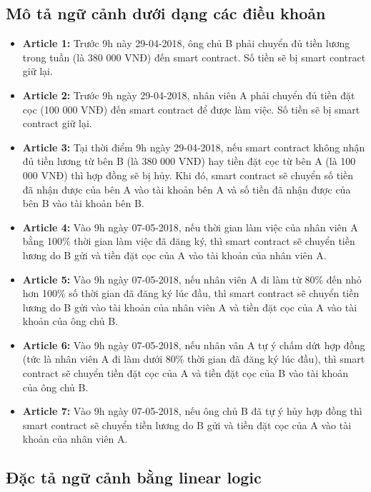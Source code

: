 \documentclass[12pt,a4paper,oneside]{article}
\begin{document}
\subsection{Mô tả ngữ cảnh dưới dạng các điều khoản}
\begin{itemize}
	\item \textbf{Article 1:} Trước 9h này 29-04-2018, ông chủ B phải chuyển đủ tiền lương trong tuần (là 380 000 VNĐ) đến smart contract. Số tiền sẽ bị smart contract giữ lại.
	\item \textbf{Article 2:} Trước 9h ngày 29-04-2018, nhân viên A phải chuyển đủ tiền đặt cọc (100 000 VNĐ) đến smart contract để được làm việc. Số tiền sẽ bị smart contract giữ lại.
	\item \textbf{Article 3:} Tại thời điểm 9h ngày 29-04-2018, nếu smart contract không nhận đủ tiền lương từ bên B (là 380 000 VNĐ) hay tiền đặt cọc từ bên A (là 100 000 VNĐ) thì hợp đồng sẽ bị hủy. Khi đó, smart contract sẽ chuyển số tiền đã nhận được của bên A vào tài khoản bên A và số tiền đã nhận được của bên B vào tài khoản bên B.
	\item \textbf{Article 4:} Vào 9h ngày 07-05-2018, nếu thời gian làm việc của nhân viên A bằng 100\% thời gian làm việc đã đăng ký, thì smart contract sẽ chuyển tiền lương do B gửi và tiền đặt cọc của A vào tài khoản của nhân viên A.
	\item \textbf{Article 5:} Vào 9h ngày 07-05-2018, nếu nhân viên A đi làm từ 80\% đến nhỏ hơn 100\% số thời gian đã đăng ký lúc đầu, thì smart contract sẽ chuyển tiền lương do B gửi vào tài khoản của nhân viên A và tiền đặt cọc của A vào tài khoản của ông chủ B.
	\item \textbf{Article 6:} Vào 9h ngày 07-05-2018, nếu nhân vân A tự ý chấm dứt hợp đồng (tức là nhân viên A đi làm dưới 80\% thời gian đã đăng ký lúc đầu), thì smart contract sẽ chuyển tiền đặt cọc của A và tiền đặt cọc của B vào tài khoản của ông chủ B. 
	\item \textbf{Article 7:} Vào 9h ngày 07-05-2018, nếu ông chủ B đã tự ý hủy hợp đồng thì smart contract sẽ chuyển tiền lương do B gửi và tiền đặt cọc của A vào tài khoản của nhân viên A.
\end{itemize}

\subsection{Đặc tả ngữ cảnh bằng linear logic}
\end{document}
